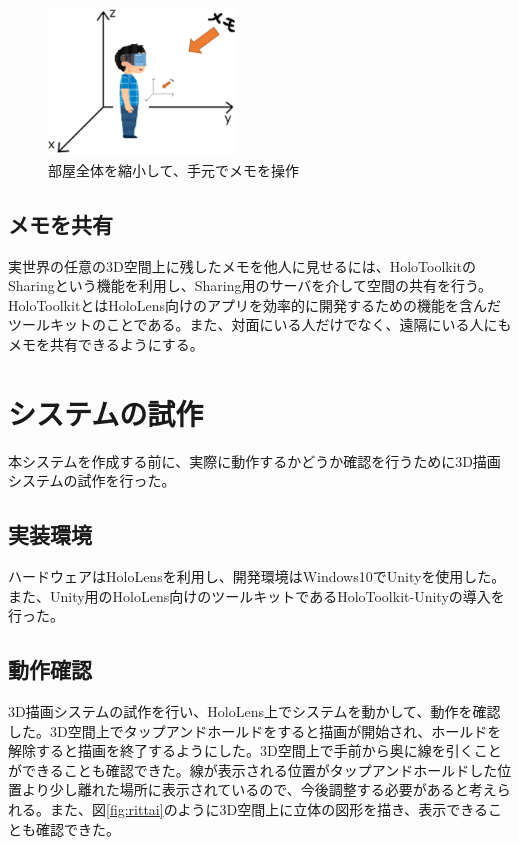 \documentclass[twocolumn, a4paper]{UECIEresume}
\begin{document}
\begin{figure}[h]
  \begin{center}
    \includegraphics[clip,height=4.0cm,width=5.0cm]{./roomshukusho.eps}
    \caption{部屋全体を縮小して、手元でメモを操作}
    \label{fig:roomshukusho}
  \end{center}
\end{figure}

\subsection{メモを共有}
実世界の任意の3D空間上に残したメモを他人に見せるには、HoloToolkit\cite{tex7}のSharing\cite{tex8}という機能を利用し、Sharing用のサーバを介して空間の共有を行う。HoloToolkitとはHoloLens向けのアプリを効率的に開発するための機能を含んだツールキットのことである。また、対面にいる人だけでなく、遠隔にいる人にもメモを共有できるようにする。

\section{システムの試作}
本システムを作成する前に、実際に動作するかどうか確認を行うために3D描画システムの試作を行った。

\subsection{実装環境}
ハードウェアはHoloLensを利用し、開発環境はWindows10でUnity\cite{tex9}を使用した。また、Unity用のHoloLens向けのツールキットであるHoloToolkit-Unityの導入を行った。

\subsection{動作確認}
3D描画システムの試作を行い、HoloLens上でシステムを動かして、動作を確認した。3D空間上でタップアンドホールドをすると描画が開始され、ホールドを解除すると描画を終了するようにした。3D空間上で手前から奥に線を引くことができることも確認できた。線が表示される位置がタップアンドホールドした位置より少し離れた場所に表示されているので、今後調整する必要があると考えられる。また、図\ref{fig:rittai}のように3D空間上に立体の図形を描き、表示できることも確認できた。
\end{document}
